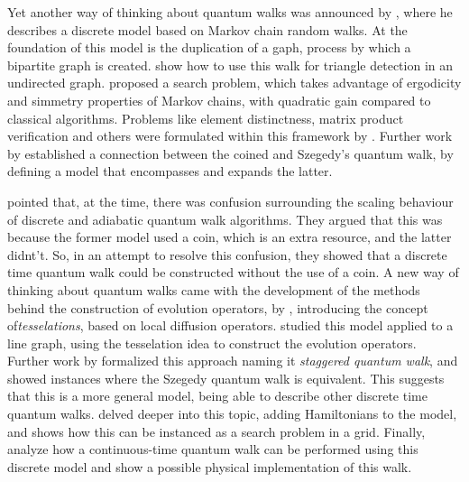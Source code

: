 \documentclass[../../dissertation.tex]{subfiles}
\begin{document}
Yet another way of thinking about quantum walks was announced by
\cite{szegedy2004}, where he describes a discrete model based on Markov chain
random walks. At the foundation of this model is the duplication of a gaph,
process by which a bipartite graph is created. \cite{magniez2005} show how to
use this walk for triangle detection in an undirected graph. \cite{magniez2006}
proposed a search problem, which takes advantage of ergodicity and simmetry
properties of Markov chains, with quadratic gain compared to classical
algorithms. Problems like element distinctness, matrix product verification and
others were formulated within this framework by \cite{santha2008}. Further work
by \cite{portugal2015} established a connection between the coined and Szegedy's quantum
walk, by defining a model that encompasses and expands the latter.\par 

\cite{patel2004} pointed that, at the time, there was confusion surrounding the
scaling behaviour of discrete and adiabatic quantum walk algorithms. They
argued that this was because the former model used a coin, which is an extra
resource, and the latter didnt't. So, in an attempt to resolve this confusion,
they showed that a discrete time quantum walk could be constructed without the
use of a coin. A new way of thinking about quantum walks came with the
development of the methods behind the construction of evolution operators, by
\cite{falk2013}, introducing the concept of\textit{tesselations}, based on
local diffusion operators. \cite{portugal2014} studied this model applied to a
line graph, using the tesselation idea to construct the evolution operators.
Further work by \cite{portugal2015b} formalized this approach naming it
\textit{staggered quantum walk}, and showed instances where the Szegedy quantum
walk is equivalent. This suggests that this is a more general model, being able
to describe other discrete time quantum walks. \cite{portugal2017b} delved
deeper into this topic, adding Hamiltonians to the model, and
\cite{portugal2017a} shows how this can be instanced as a search problem in a
grid. Finally, \cite{coutinho2017} analyze how a continuous-time quantum walk
can be performed using this discrete model and \cite{moqadam2016} show a
possible physical implementation of this walk.
\end{document}
